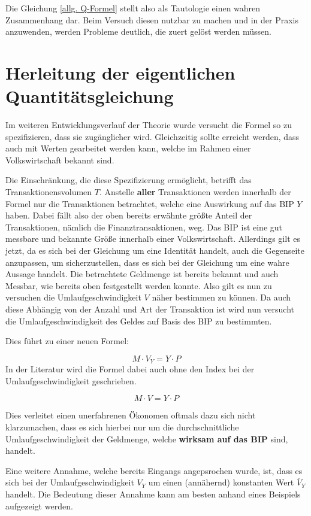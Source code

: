 Die Gleichung \vref{allg. Q-Formel} stellt also als Tautologie einen wahren Zusammenhang dar. Beim Versuch diesen nutzbar zu machen und in der Praxis anzuwenden, werden Probleme deutlich, die zuert gelöst werden müssen.

\section{Herleitung der eigentlichen Quantitätsgleichung}
Im weiteren Entwicklungsverlauf der Theorie wurde versucht die Formel so zu spezifizieren, dass sie zugänglicher wird. Gleichzeitig sollte erreicht werden, dass auch mit Werten gearbeitet werden kann, welche im Rahmen einer Volkswirtschaft bekannt sind.

Die Einschränkung, die diese Spezifizierung ermöglicht, betrifft das Transaktionensvolumen $T$. Anstelle \textbf{aller} Transaktionen werden innerhalb der Formel nur die Transaktionen betrachtet, welche eine Auswirkung auf das BIP $Y$ haben. Dabei fällt also der oben bereits erwähnte größte Anteil der Transaktionen, nämlich die Finanztransaktionen, weg. Das BIP ist eine gut messbare und bekannte Größe innerhalb einer Volkswirtschaft. Allerdings gilt es jetzt, da es sich bei der Gleichung um eine Identität handelt, auch die Gegenseite anzupassen, um sicherzustellen, dass es sich bei der Gleichung um eine wahre Aussage handelt. Die betrachtete Geldmenge ist bereits bekannt und auch Messbar, wie bereits oben festgestellt werden konnte. Also gilt es nun zu versuchen die Umlaufgeschwindigkeit $V$ näher bestimmen zu können. Da auch diese Abhängig von der Anzahl und Art der Transaktion ist wird nun versucht die Umlaufgeschwindigkeit des Geldes auf Basis des BIP zu bestimmten.

Dies führt zu einer neuen Formel: 

$$ M \cdot V_Y = Y \cdot P$$\label{QFormel}
In der Literatur wird die Formel dabei auch ohne den Index bei der Umlaufgeschwindigkeit geschrieben.

$$ M \cdot V = Y \cdot P$$

Dies verleitet einen unerfahrenen Ökonomen oftmals dazu sich nicht klarzumachen, dass es sich hierbei nur um die durchschnittliche Umlaufgeschwindigkeit der Geldmenge, welche \textbf{wirksam auf das BIP} sind, handelt.

Eine weitere Annahme, welche bereits Eingangs angepsrochen wurde, ist, dass es sich bei der Umlaufgeschwindigkeit $V_Y$ um einen (annähernd) konstanten Wert $\overline{V}_Y$ handelt. Die Bedeutung dieser Annahme kann am besten anhand eines Beispiels aufgezeigt werden.


